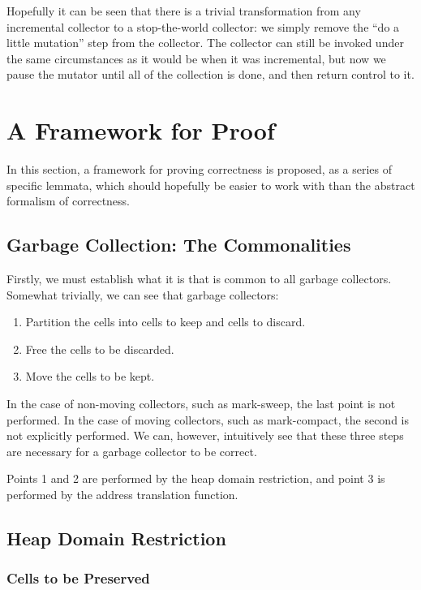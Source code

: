Hopefully it can be seen that there is a trivial transformation from
any \gls{incremental collector} to a stop-the-world \gls{collector}:
we simply remove the ``do a little mutation'' step from the
collector. The collector can still be invoked under the same
circumstances as it would be when it was incremental, but now we pause
the \gls{mutator} until all of the collection is done, and then return
control to it.

\section{A Framework for Proof}

In this section, a framework for proving correctness is proposed, as a
series of specific lemmata, which should hopefully be easier to work
with than the abstract formalism of correctness.

\subsection{Garbage Collection: The Commonalities}

Firstly, we must establish what it is that is common to all
\glspl{garbage collector}. Somewhat trivially, we can see that
\glspl{garbage collector}:

\begin{enumerate}
  \item Partition the \glspl{cell} into cells to keep and cells to
    discard.
  \item Free the cells to be discarded.
  \item Move the cells to be kept.
\end{enumerate}

In the case of non-moving collectors, such as mark-sweep, the last
point is not performed. In the case of moving collectors, such as
mark-compact, the second is not explicitly performed. We can, however,
intuitively see that these three steps are necessary for a garbage
collector to be correct.

Points 1 and 2 are performed by the \gls{heap} domain restriction, and
point 3 is performed by the address translation function.

\subsection{Heap Domain Restriction}

\subsubsection{Cells to be Preserved}

